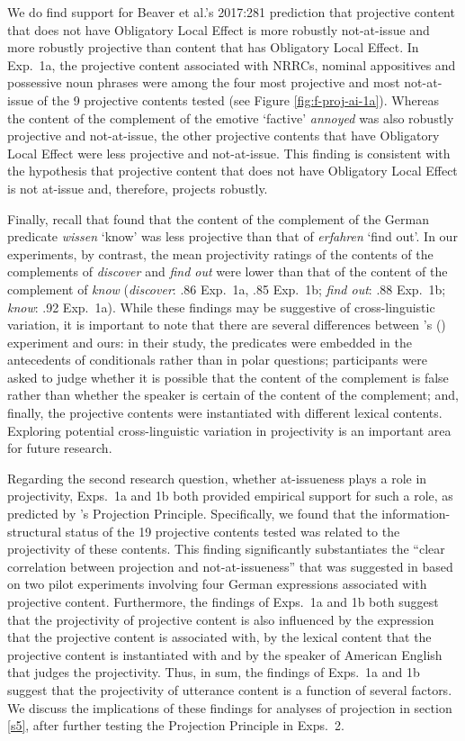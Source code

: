 \documentclass[11pt,fleqn]{article}
\newcommand{\6}{\mbox{$[\hspace*{-.6mm}[$}}
\newcommand{\9}{\mbox{$]\hspace*{-.6mm}]$}}
\newcommand{\citepos}[1]{\citeauthor{#1}'s \citeyear{#1}}
\newcommand{\citetpos}[1]{\citeauthor{#1}'s (\citeyear{#1})}
\begin{document}
We do find support for Beaver et al.'s 2017:281 prediction that projective content that does not have Obligatory Local Effect is more robustly not-at-issue and more robustly projective than content that has Obligatory Local Effect. In Exp.~1a, the projective content associated with NRRCs, nominal appositives and possessive noun phrases were among the four most projective and most not-at-issue of the 9 projective contents tested (see Figure \ref{fig:f-proj-ai-1a}). Whereas the content of the complement of the emotive `factive' {\em annoyed} was also robustly projective and not-at-issue, the other projective contents that have Obligatory Local Effect were less projective and not-at-issue. This finding is consistent with the hypothesis that projective content that does not have Obligatory Local Effect is not at-issue and, therefore, projects robustly.

Finally, recall that \citet{xue-onea11} found that the content of the complement of the German predicate {\em wissen} `know' was less projective than that of {\em erfahren} `find out'. In our experiments, by contrast, the mean projectivity ratings of the contents of the complements of {\em discover} and {\em find out} were lower  than that of the content of the complement of {\em know} ({\em discover}: .86 Exp.~1a, .85 Exp.~1b; {\em find out}: .88 Exp.~1b; {\em know}: .92 Exp.~1a). While these findings may be suggestive of cross-linguistic variation, it is important to note that there are several differences between \citetpos{xue-onea11} experiment and ours: in their study, the predicates were embedded in the antecedents of conditionals rather than in polar questions; participants were asked to judge whether it is possible that the content of the complement is false rather than whether the speaker is certain of the content of the complement; and, finally, the projective contents were instantiated with different lexical contents. Exploring potential cross-linguistic variation in projectivity is an important area for future research.

Regarding the second research question, whether at-issueness plays a role in projectivity, Exps.~1a and 1b both provided empirical support for such a role, as predicted by  \citepos{brst-ar} Projection Principle. Specifically, we found that the information-structural status of the 19 projective contents tested was related to the projectivity of these contents. This finding significantly substantiates the ``clear correlation between projection and not-at-issueness'' that was suggested in \citealt[180]{xue-onea11} based on two pilot experiments involving four German expressions associated with projective content. Furthermore, the findings of Exps.~1a and 1b both suggest that the projectivity of projective content is also influenced by the expression that the projective content is associated with, by the lexical content that the projective content is instantiated with and by the speaker of American English that judges the projectivity.  Thus, in sum, the findings of Exps.~1a and 1b suggest that the projectivity of utterance content is a function of several factors. We discuss the implications of these findings for analyses of projection in section \ref{s5}, after further testing the Projection Principle in Exps.~2.
\end{document}

